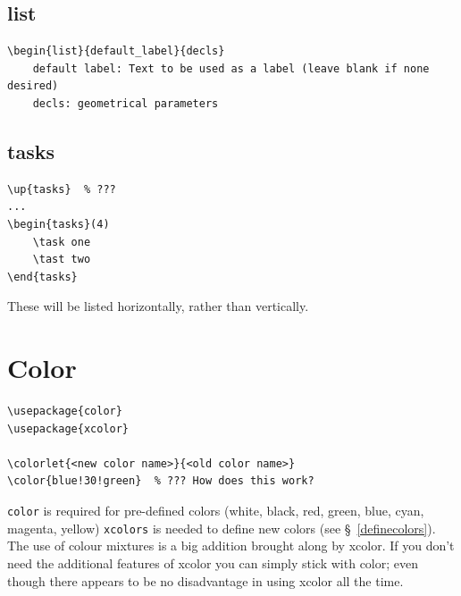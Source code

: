 \documentclass{article}
\begin{document}
\subsection{list}
\begin{lstlisting}
\begin{list}{default_label}{decls}
    default label: Text to be used as a label (leave blank if none desired)
    decls: geometrical parameters
\end{lstlisting}

\subsection{tasks}
\begin{lstlisting}
\up{tasks}  % ???
...
\begin{tasks}(4)
    \task one
    \tast two
\end{tasks}
\end{lstlisting}
These will be listed horizontally, rather than vertically.


\section{Color}\label{color}
\begin{minipage}{0.5\textwidth}
\begin{lstlisting}
\usepackage{color}
\usepackage{xcolor}

\colorlet{<new color name>}{<old color name>}
\color{blue!30!green}  % ??? How does this work?
\end{lstlisting}
\end{minipage}
\begin{minipage}{0.5\textwidth}
\texttt{color} is required for pre-defined colors (white, black, red, green,
blue, cyan, magenta, yellow) \texttt{xcolors} is needed to define new
colors (see \S{}~\ref{definecolors}).  The use of colour mixtures is a big
addition brought along by xcolor. If
you don't need the additional features of xcolor you can simply stick with
color; even though there appears to be no disadvantage in using xcolor all
the time.
\end{minipage}
\end{document}
